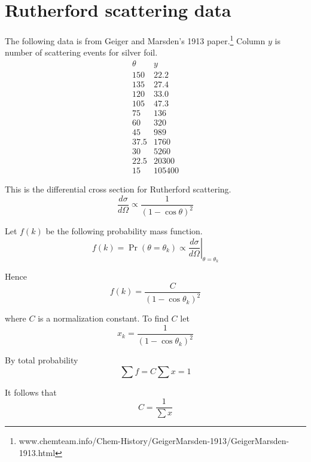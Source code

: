 

\section*{Rutherford scattering data}

The following data is from Geiger and Marsden's 1913 paper.\footnote{www.chemteam.info/Chem-History/GeigerMarsden-1913/GeigerMarsden-1913.html}
Column $y$ is number of scattering events for silver foil.
\begin{equation*}
\begin{matrix}
\theta & y\\
150 & 22.2\\
135 & 27.4\\
120 & 33.0\\
105 & 47.3\\
75 & 136\\
60 & 320\\
45 & 989\\
37.5 & 1760\\
30 & 5260\\
22.5 & 20300\\
15 & 105400
\end{matrix}
\end{equation*}

This is the differential cross section for Rutherford scattering.
\begin{equation*}
\frac{d\sigma}{d\Omega}\propto
\frac{1}{(1-\cos\theta)^2}
\end{equation*}

Let $f(k)$ be the following probability mass function.
\begin{equation*}
f(k)=\Pr(\theta=\theta_k)\propto\left.\frac{d\sigma}{d\Omega}\right|_{\theta=\theta_k}
\end{equation*}

Hence
\begin{equation*}
f(k)=\frac{C}{(1-\cos\theta_k)^2}
\end{equation*}

where $C$ is a normalization constant.
To find $C$ let
\begin{equation*}
x_k=\frac{1}{(1-\cos\theta_k)^2}
\end{equation*}

By total probability
\begin{equation*}
\sum f=C\sum x=1
\end{equation*}

It follows that
\begin{equation*}
C=\frac{1}{\sum x}
\end{equation*}

